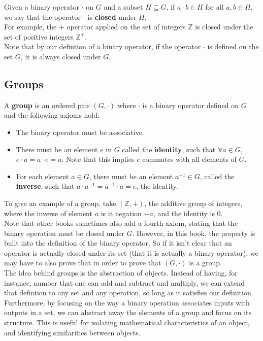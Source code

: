 \documentclass[12pt]{article}
\newcommand{\Z}{\mathbb{Z}}
\begin{document}
    Given a binary operator $\cdot$ on $G$
    and a subset $H \subseteq G$,
    if $a \cdot b \in H$ for all $a, b \in H$,
    we say that the operator $\cdot$ is \textbf{closed} under $H$. \\
    For example,
    the $+$ operator applied on the set of integers $\Z$
    is closed under the set of positive integers $\Z^+$. \\
    Note that by our defintion of a binary operator,
    if the operator $\cdot$ is defined on the set $G$,
    it is always closed under $G$. \\
    

    \subsection*{Groups}

    A \textbf{group} is an ordered pair $(G, \cdot)$
    where $\cdot$ is a binary operator defined on $G$
    and the following axioms hold:
    \begin{itemize}[label=$\diamond$]
        \item 
            The binary operator must be associative.
        \item 
            There must be an element $e$ in $G$ called the \textbf{identity},
            such that $\forall a \in G$,
            $e \cdot a = a \cdot e = a$.
            Note that this implies $e$ commutes with all elements of $G$.
        \item
            For each element $a \in G$,
            there must be an element $a^{-1} \in G$,
            called the \textbf{inverse},
            such that $a \cdot a^{-1} = a^{-1} \cdot a = e$,
            the identity.
    \end{itemize}
    To give an example of a group,
    take $(\Z, +)$,
    the additive group of integers,
    where the inverse of element $a$ is it negation $-a$,
    and the identity is $0$. \\ 
    Note that other books sometimes also add a fourth axiom,
    stating that the binary operation must be closed under $G$.
    However, in this book, the property is built into the definition
    of the binary operator.
    So if it isn't clear that an operator is actually
    closed under its set (that it is actually a binary operator),
    we may have to also prove that
    in order to prove that $(G, \cdot)$ is a group. \\

    The idea behind groups is the abstraction of objects.
    Instead of having, for instance,
    number that one can add and subtract and multiply,
    we can extend that defintion to any set and any operation,
    so long as it satisfies our definition. \\
    Furthermore,
    by focusing on the way a binary operation associates inputs
    with outputs in a set,
    we can abstract away the elements of a group and focus on its structure.
    This is useful for isolating mathematical characteristics of an object,
    and identifying similarities between objects. \\
\end{document}
